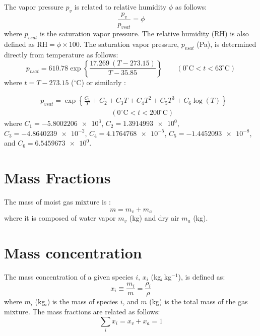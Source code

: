 The vapor pressure $p_v$ is related to relative humidity $\phi$ as follows:
\begin{equation}
\frac{p_v}{p_{\textit{vsat}}} = \phi
\end{equation}
where $p_{\textit{vsat}}$ is the saturation vapor pressure. The relative humidity (RH) is also defined as $\textrm{RH}=\phi\times 100$. The saturation vapor pressure, $p_{\textit{vsat}}$ (Pa), is determined directly from temperature as follows\citep{Singh2002}:
\begin{equation}
p_{vsat} = 610.78 \exp \left\{\frac{17.269\ (T - 273.15)}{T - 35.85}\right\} \qquad (0^{\circ}\mathrm{C} < t < 63^{\circ}\mathrm{C})
\end{equation}
where $t = T - 273.15$ ($^{\circ}$C) or similarly \citep{ASHRAE2013}:

\begin{align}
&p_{vsat} = \exp \left\{\frac{C_1}{T} + C_2 + C_3 T + C_4 T^2 + C_5 T^3 + C_6 \log(T)\right\}\\
& \hspace{10em} (0^{\circ}\mathrm{C} < t < 200^{\circ}\mathrm{C})
\end{align}
where $C_1 = \num{-5.8002206e3}$, $C_2 = \num{1.3914993e0}$, $C_3 = \num{-4.8640239e-2}$, $C_4 = \num{4.1764768e-5}$, $C_5 = \num{-1.4452093e-8}$, and $C_6 = \num{6.5459673e0}$.

\section*{Mass Fractions}

The mass of moist gas mixture is :
\begin{equation}
m = m_v + m_a
\end{equation}
where it is composed of water vapor $m_v$ (kg) and dry air $m_a$ (kg).

\section*{Mass concentration}

The mass concentration of a given species $i$, $x_i$ (kg$_i$\,kg$^{-1}$), is defined as:
\begin{equation}
x_i \equiv \frac{m_i}{m} = \frac{\rho_i}{\rho}
\end{equation}
where $m_i$ (kg$_i$) is the mass of species $i$, and $m$ (kg) is the total mass of the gas mixture. The mass fractions are related as follows:
\begin{equation}
\sum_i x_i = x_v + x_a = 1
\label{eq:totalconc}
\end{equation}

